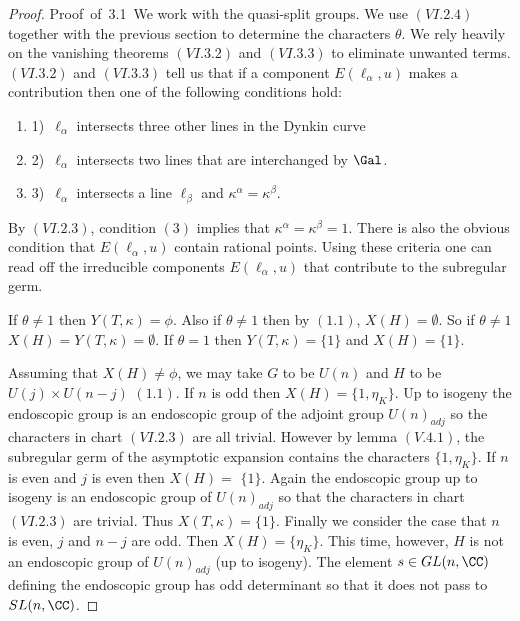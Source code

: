 \documentclass{memo-l}
\theoremstyle{definition}
\theoremstyle{remark}
\numberwithin{section}{chapter}
\numberwithin{equation}{chapter}
\begin{document}
\begin{proof} {Proof\ of\ 3.1}\ We work with the quasi-split groups.  We use
$(VI.2.4)$ together with the previous section to determine the characters
${\theta}$.  We rely heavily on the vanishing theorems $(VI.3.2)$ and
$(VI.3.3)$ to eliminate unwanted terms.  $(VI.3.2)$ and $(VI.3.3)$ tell us
that if a component $E({\ell}_{{\alpha}},u)$ makes a contribution then one
of the following conditions hold:
\begin{enumerate}
\item{1)}\ ${\ell}_{{\alpha}}$ intersects three other lines in the Dynkin curve
\item{2)}\ ${\ell}_{{\alpha}}$ intersects two lines that are interchanged by
$\Gal$.
\item{3)}\ ${\ell}_{{\alpha}}$ intersects a line ${\ell}_{{\beta}}$ and
${\kappa}^{{\alpha}} = {\kappa}^{{\beta}}$.
\end{enumerate}

\noindent
By $(VI.2.3)$, condition $(3)$ implies that
${\kappa}^{{\alpha}} = {\kappa}^{{\beta}} = 1$.  There is also the obvious
condition that $E({\ell}_{{\alpha}},u)$ contain rational points.  Using
these criteria one can read off the irreducible components
$E({\ell}_{{\alpha}},u)$ that contribute to the subregular germ.


 If ${\theta} \ne 1$ then $Y(T,{\kappa})  =  {\phi}$.  Also if
${\theta} \ne 1$ then by $(1.1)$,  $X(H) = {\emptyset}$.  So if ${\theta} \ne 
1$ $ X(H) = Y(T,{\kappa}) = {\emptyset}$.  If ${\theta} = 1$ then $Y(T,{\kappa}) = \{1\}$ and
$X(H) = \{1\}$.
\enddefinition


  Assuming that $X(H)  \ne {\phi}$, we may take $G$ to
be $U(n)$ and $H$ to be $U(j) \times U(n-j)$ $(1.1)$.  If $n$ is odd then
$X(H)  =  \{1,{\eta}_{K}\}$.  Up to isogeny the
endoscopic group is an endoscopic group of the adjoint group $U(n)_{adj}$ so
the characters in chart $(VI.2.3)$ are all trivial.  However by lemma
$(V.4.1)$, the subregular germ of the asymptotic expansion contains the
characters $\{1,{\eta}_{K}\}$.  If $n$ is even and $j$ is even then $X(H)
 = $ $\{1\}$.  Again the endoscopic group up to isogeny
is an endoscopic group of $U(n)_{adj}$ so that the characters in chart
$(VI.2.3)$ are trivial.  Thus $X(T,{\kappa})  =  \{1\}$.  Finally we consider
the case that $n$ is even, $j$ and $n-j$ are odd.  Then $X(H)  = 
\{{\eta}_{K}\}$.  This time, however, $H$ is not an endoscopic group of
$U(n)_{adj}$ (up to isogeny).  The element $s  \in 
GL(n,{\CC})$ defining the endoscopic group has odd determinant so that
it does not pass to $SL(n,{\CC})$.
\enddefinition
 


\end{proof}
\end{document}
